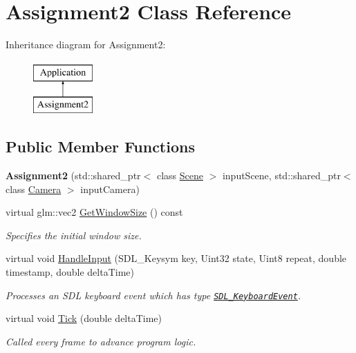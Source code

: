 \hypertarget{class_assignment2}{}\section{Assignment2 Class Reference}
\label{class_assignment2}
Inheritance diagram for Assignment2\+:\begin{figure}[H]
\begin{center}
\leavevmode
\includegraphics[height=2.000000cm]{class_assignment2}
\end{center}
\end{figure}
\subsection*{Public Member Functions}
\begin{DoxyCompactItemize}
\item 
\hypertarget{class_assignment2_ac684d2ecb894a4e71f8359e3a2ebd37f}{}{\bfseries Assignment2} (std\+::shared\+\_\+ptr$<$ class \hyperlink{class_scene}{Scene} $>$ input\+Scene, std\+::shared\+\_\+ptr$<$ class \hyperlink{class_camera}{Camera} $>$ input\+Camera)\label{class_assignment2_ac684d2ecb894a4e71f8359e3a2ebd37f}

\item 
virtual glm\+::vec2 \hyperlink{class_assignment2_ae7ae8c9e7eb64cf9661d9ddb1992f314}{Get\+Window\+Size} () const 
\begin{DoxyCompactList}\small\item\em Specifies the initial window size. \end{DoxyCompactList}\item 
virtual void \hyperlink{class_assignment2_a3ee099a8ba45db14103541981e3c4fe8}{Handle\+Input} (S\+D\+L\+\_\+\+Keysym key, Uint32 state, Uint8 repeat, double timestamp, double delta\+Time)
\begin{DoxyCompactList}\small\item\em Processes an S\+D\+L keyboard event which has type \href{https://wiki.libsdl.org/SDL_KeyboardEvent}{\tt S\+D\+L\+\_\+\+Keyboard\+Event}. \end{DoxyCompactList}\item 
virtual void \hyperlink{class_assignment2_a41544ad361dd798d5fae1ec3197fc66e}{Tick} (double delta\+Time)
\begin{DoxyCompactList}\small\item\em Called every frame to advance program logic. \end{DoxyCompactList}\end{DoxyCompactItemize}
